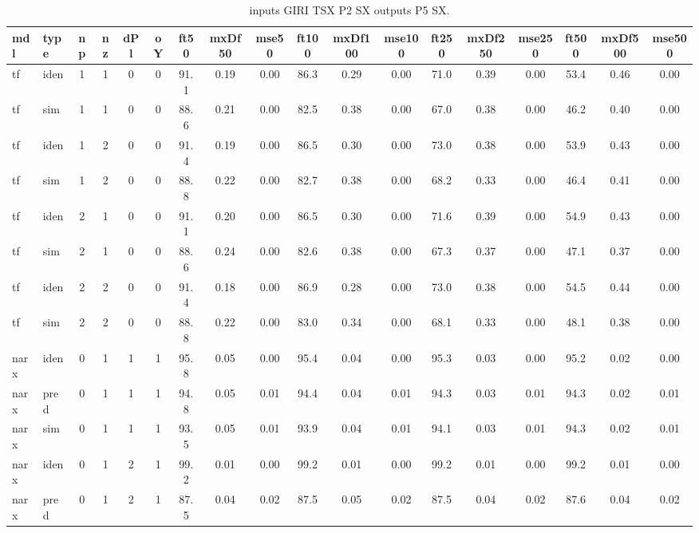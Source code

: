 \begin{landscape} 
 \begin{center} 
 \footnotesize 
 \begin{longtable}{ll|cccc|ccc|ccc|ccc|ccc} 
\caption[inputs GIRI TSX P2 SX   outputs P5 SX]{inputs GIRI TSX P2 SX   outputs P5 SX.} 
\label{tab:inputs_GIRI_TSX_P2_SX___outputs_P5_SX} 
\hline 
  mdl & type & np & nz & dPl & oY & ft50 & mxDf50 & mse50 & ft100 & mxDf100 & mse100 & ft250 & mxDf250 & mse250 & ft500 & mxDf500 & mse500 \\ 
 \hline 
tf  & iden & 1 & 1 & 0 & 0 & 91.1 & 0.19 & 0.00 & 86.3 & 0.29 & 0.00 & 71.0 & 0.39 & 0.00 & 53.4 & 0.46 & 0.00 \\ 
tf  & sim  & 1 & 1 & 0 & 0 & 88.6 & 0.21 & 0.00 & 82.5 & 0.38 & 0.00 & 67.0 & 0.38 & 0.00 & 46.2 & 0.40 & 0.00 \\ 
 \hline 
tf  & iden & 1 & 2 & 0 & 0 & 91.4 & 0.19 & 0.00 & 86.5 & 0.30 & 0.00 & 73.0 & 0.38 & 0.00 & 53.9 & 0.43 & 0.00 \\ 
tf  & sim  & 1 & 2 & 0 & 0 & 88.8 & 0.22 & 0.00 & 82.7 & 0.38 & 0.00 & 68.2 & 0.33 & 0.00 & 46.4 & 0.41 & 0.00 \\ 
 \hline 
tf  & iden & 2 & 1 & 0 & 0 & 91.1 & 0.20 & 0.00 & 86.5 & 0.30 & 0.00 & 71.6 & 0.39 & 0.00 & 54.9 & 0.43 & 0.00 \\ 
tf  & sim  & 2 & 1 & 0 & 0 & 88.6 & 0.24 & 0.00 & 82.6 & 0.38 & 0.00 & 67.3 & 0.37 & 0.00 & 47.1 & 0.37 & 0.00 \\ 
 \hline 
tf  & iden & 2 & 2 & 0 & 0 & 91.4 & 0.18 & 0.00 & 86.9 & 0.28 & 0.00 & 73.0 & 0.38 & 0.00 & 54.5 & 0.44 & 0.00 \\ 
tf  & sim  & 2 & 2 & 0 & 0 & 88.8 & 0.22 & 0.00 & 83.0 & 0.34 & 0.00 & 68.1 & 0.33 & 0.00 & 48.1 & 0.38 & 0.00 \\ 
 \hline 
narx & iden & 0 & 1 & 1 & 1 & 95.8 & 0.05 & 0.00 & 95.4 & 0.04 & 0.00 & 95.3 & 0.03 & 0.00 & 95.2 & 0.02 & 0.00 \\ 
narx & pred & 0 & 1 & 1 & 1 & 94.8 & 0.05 & 0.01 & 94.4 & 0.04 & 0.01 & 94.3 & 0.03 & 0.01 & 94.3 & 0.02 & 0.01 \\ 
narx & sim  & 0 & 1 & 1 & 1 & 93.5 & 0.05 & 0.01 & 93.9 & 0.04 & 0.01 & 94.1 & 0.03 & 0.01 & 94.3 & 0.02 & 0.01 \\ 
 \hline 
narx & iden & 0 & 1 & 2 & 1 & 99.2 & 0.01 & 0.00 & 99.2 & 0.01 & 0.00 & 99.2 & 0.01 & 0.00 & 99.2 & 0.01 & 0.00 \\ 
narx & pred & 0 & 1 & 2 & 1 & 87.5 & 0.04 & 0.02 & 87.5 & 0.05 & 0.02 & 87.5 & 0.04 & 0.02 & 87.6 & 0.04 & 0.02 \\ 

\end{longtable}
\end{center}
\end{landscape}
